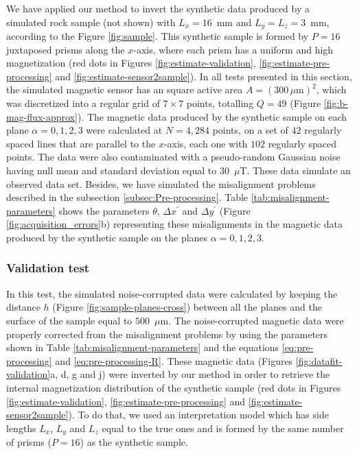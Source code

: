 \documentclass[draft,gc]{agutex}
\begin{document}
\begin{article}
We have applied our method to invert the synthetic data produced
by a simulated rock sample (not shown) with $L_{x} = 16$~mm and 
$L_{y} = L_{z} = 3$~mm, according to the Figure \ref{fig:sample}.
This synthetic sample is formed by $P = 16$ juxtaposed prisms along 
the $x$-axis, where each prism has a uniform and high magnetization
(red dots in Figures \ref{fig:estimate-validation},
\ref{fig:estimate-pre-processing} and \ref{fig:estimate-sensor2sample}).
In all tests presented in this section, 
the simulated magnetic sensor has an square active area  
$A = (300 \, \mu \text{m})^{2}$, which was discretized into
a regular grid of $7 \times 7$ points, totalling $Q = 49$
(Figure \ref{fig:b-mag-flux-approx}). The
magnetic data produced by the synthetic sample on 
each plane $\alpha = 0, 1, 2, 3$ were calculated at
$N = 4,284$ points, on a set of $42$ regularly spaced lines 
that are parallel to the $x$-axis, each one with $102$ regularly
spaced points. The data were also contaminated with a 
pseudo-random Gaussian noise having null mean and standard 
deviation equal to $30$~$\mu$T. These data simulate
an observed data set.
Besides, we have simulated the misalignment problems 
described in the subsection \ref{subsec:Pre-processing}.
Table \ref{tab:misalignment-parameters} shows the parameters
$\theta$, $\Delta x^{\prime}$ and $\Delta y^{\prime}$ (Figure 
\ref{fig:acquisition_errors}b) representing these misalignments
in the magnetic data produced by the synthetic sample on
the planes $\alpha = 0, 1, 2, 3$.

\subsubsection{Validation test}
\label{subsec:Validation test}

In this test, the simulated noise-corrupted data were calculated 
by keeping the distance $h$ (Figure \ref{fig:sample-planes-cross}) 
between all the planes and the surface of the sample equal to 
$500$~$\mu$m.
The noise-corrupted magnetic data were properly corrected 
from the misalignment problems by using the parameters shown in 
Table \ref{tab:misalignment-parameters} and the equations 
\ref{eq:pre-processing} and \ref{eq:pre-processing-R}.
These magnetic data (Figures \ref{fig:datafit-validation}a, d, g and j)
were inverted by our method in order to retrieve the internal
magnetization distribution of the synthetic sample
(red dots in Figures \ref{fig:estimate-validation},
\ref{fig:estimate-pre-processing} and \ref{fig:estimate-sensor2sample}).
To do that, we used an interpretation model which has side lengths 
$L_{x}$, $L_{y}$ and $L_{z}$ equal to the true ones and is
formed by the same number of prisms ($P = 16$) as the synthetic sample.


\end{article}
\end{document}

